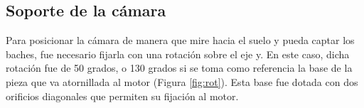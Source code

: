 	



\subsection{Soporte de la cámara}
\label{subsec:soportecamara}

Para posicionar la cámara de manera que mire hacia el suelo y pueda captar los baches, fue necesario fijarla con una rotación sobre el eje y. En este caso, dicha rotación fue de 50 grados, o 130 grados si se toma como referencia la base de la pieza que va atornillada al motor (Figura \ref{fig:rot}). Esta base fue dotada con dos orificios diagonales que permiten su fijación al motor.

